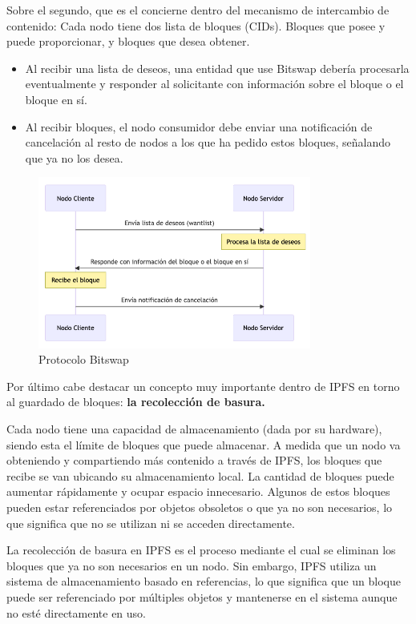 Sobre el segundo, que es el concierne dentro del mecanismo de intercambio de contenido: Cada nodo tiene dos lista de bloques (CIDs). Bloques que posee y puede
proporcionar, y bloques que desea obtener.
\begin{itemize}[itemsep=1pt]
      \item Al recibir una lista de deseos, una entidad que use Bitswap debería procesarla eventualmente y responder al solicitante con información sobre el bloque o el bloque en sí.
      \item Al recibir bloques, el nodo consumidor debe enviar una notificación de cancelación al resto de nodos a los que ha pedido estos bloques, señalando que  ya no los desea.
\end{itemize}


\begin{figure}[H]
      \centering
      \includegraphics[width=0.8\textwidth]{images/bitswap.png}
      \caption{Protocolo Bitswap}
      \label{bitswap}
\end{figure}


Por último cabe destacar un concepto muy importante dentro de IPFS en torno al guardado de bloques:
\textbf{la recolección de basura.}

Cada nodo tiene una capacidad de almacenamiento (dada por su hardware), siendo esta el límite de bloques que puede almacenar. A medida que un nodo va obteniendo y compartiendo más
contenido a través de IPFS, los bloques que recibe se van ubicando su almacenamiento local. La cantidad de bloques puede aumentar
rápidamente y ocupar espacio innecesario. Algunos de estos bloques pueden estar referenciados por objetos obsoletos o que ya no son
necesarios, lo que significa que no se utilizan ni se acceden directamente.

La recolección de basura en IPFS es el proceso mediante el cual se eliminan los bloques que ya no son necesarios en un nodo. Sin embargo, IPFS utiliza un sistema de almacenamiento basado en referencias, lo que significa que un bloque puede ser referenciado por múltiples objetos y mantenerse en el sistema aunque no esté directamente en uso.

